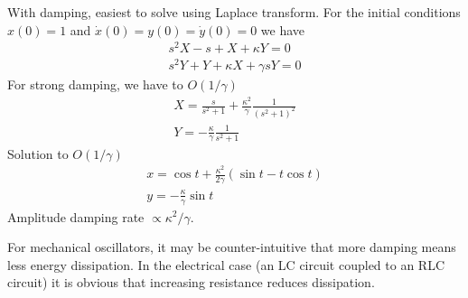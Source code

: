 \documentclass[12pt,aps,prb,preprint]{revtex4}
\begin{document}
With damping, easiest to solve using Laplace transform. For the
initial conditions $x(0)=1$ and $\dot x(0) = y(0) = \dot y(0) = 0$ we
have
\begin{equation}
\begin{array}{l}
s^2 X - s + X + \kappa Y = 0 \\
s^2 Y + Y + \kappa X + \gamma s Y = 0
\end{array}
\end{equation}
For strong damping, we have to $O(1/\gamma)$
\begin{equation}
\begin{array}{l}
\displaystyle
X = \frac s{s^2+1} + \frac{\kappa^2}\gamma \frac1{(s^2+1)^2} \\
\displaystyle
Y = -\frac\kappa\gamma \frac1{s^2+1}
\end{array}
\end{equation}
Solution to $O(1/\gamma)$
\begin{equation}
\begin{array}{l}
\displaystyle
x = \cos t + \frac{\kappa^2}{2\gamma} (\sin t - t\cos t) \\
\displaystyle
y = -\frac\kappa\gamma \sin t
\end{array}
\end{equation}
Amplitude damping rate $\propto\kappa^2/\gamma$.

For mechanical oscillators, it may be counter-intuitive that more
damping means less energy dissipation.  In the electrical case (an LC
circuit coupled to an RLC circuit) it is obvious that increasing
resistance reduces dissipation.



\newpage

\def\vmargin{\hrule height 1cm width 0pt}


\def\pgfbeamsplitter(#1,#2)#3{\pgfputat{\pgfxy(#1,#2)}
                              {\pgfbox[center,center]#3
                               \pgfxyline(-1.1,0)(0,1.1)
                               \pgfxyline(0,1.1)(1.1,0)
                               \pgfxyline(1.1,0)(0,-1.1)
                               \pgfxyline(0,-1.1)(-1.1,0)}}

\def\pgfbeamsplitter(#1,#2)#3{\pgfputat{\pgfxy(#1,#2)}
                              {\pgfbox[center,center]#3
                               \pgfxyline(-1.1,0)(0,1.1)
                               \pgfxyline(0,1.1)(1.1,0)
                               \pgfxyline(1.1,0)(0,-1.1)
                               \pgfxyline(0,-1.1)(-1.1,0)}}
\end{document}
